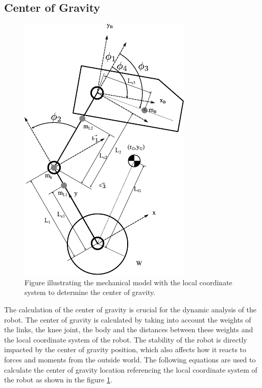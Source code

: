 \subsection{Center of Gravity }
%
%
%
%
	\begin{figure}[h]
		\centering
		\includegraphics[width=.5\textwidth]{Model}
		\caption[Mechanical model with the local coordinate system]{Figure illustrating the mechanical model with the local coordinate system to determine the center of gravity.}
		\label{fig:Mechanical model with the local coordinate system}
	\end{figure}

The calculation of the center of gravity is crucial for the dynamic analysis of the robot.
The center of gravity is calculated by taking into account the weights of the links, the knee joint, the body and the distances between these weights and the local coordinate system of the robot.
The stability of the robot is directly impacted by the center of gravity position, which also affects how it reacts to forces and moments from the outside world.
The following equations are used to calculate the center of gravity location referencing the local coordinate system of the robot as shown in the figure \ref{fig:Mechanical model with the local coordinate system}.


